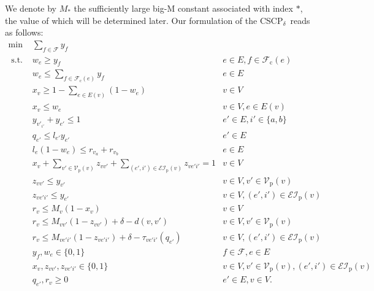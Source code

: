 \documentclass[review]{elsarticle}
\newcommand{\cF}{{\mathcal F}}
\newcommand{\cEI}{{\mathcal {EI}}}
\newcommand{\cV}{{\mathcal V}}
\newcommand{\st}{{\text{ s.t. }}}
\newcommand{\dlt}{{\delta}}
\newcommand{\problem}{CSCP$_\dlt$}
\theoremstyle{definition}
\begin{document}
We denote by $M_{*}$ the sufficiently large big-M constant associated with index $*$, the value of which will be determined later. Our formulation of the \problem\ reads as follows:
\begin{subequations}
	\label{milpa}
	\begin{align}
   	\min & \sum_{f \in \cF} y_f \label{milpa.obj} \\
	\st   & w_{e} \ge y_{f}   &  e \in E, f \in \cF_{\mathrm{c}}(e) \label{milpa.completecover1}\\
      	& w_{e} \le  \sum_{f \in \cF_{\mathrm{c}}(e)}y_{f} 	&  e \in E \label{milpa.completecover2}\\
      	& x_{v}\geq 1-\sum_{e\in E(v)} (1-w_e) &  v\in V \label{milpa.enforcex1}\\
      	& x_{v}\leq w_e &  v\in V, e\in E(v) \label{milpa.enforcex2}\\
	&  y_{v'_{i'}} + y_{e'} \le 1 &   e' \in E, i' \in \{a,b\} \label{milpa.optimale}\\
	& q_{e'}\leq l_{e'}y_{e'} & e'\in E  \label{milpa.coord} \\
	&  l_e (1 - w_e) \le  r_{v_a} + r_{v_b}	& e \in E \label{milpa.covere}\\
  &  x_{v} +\sum_{v' \in \cV_{\mathrm{p}}(v)}  z_{vv'}+ \sum_{(e', i') \in \cEI_{\mathrm{p}}(v)} z_{ve'i'} = 1  &   v\in V \label{milpa.lcoversos} \\
  &   z_{vv'} \le y_{v'}  &  v \in V,  v' \in \cV_{\mathrm{p}}(v) \label{milpa.indicatorv}\\  
	&   z_{ve'i'} \le y_{e'}  &  v \in V,  (e',i') \in \cEI_{\mathrm{p}}(v) \label{milpa.indicatorei}\\  
 &   r_{v} \le M_v (1-x_{v}) &  v\in V \label{milpa.wbdl}\\
 &   r_{v} \le M_{vv'}(1 - z_{vv'})  +  \dlt - d(v,v') & v \in V ,  v' \in \cV_{\mathrm{p}}(v) \label{milpa.coverdist-node} \\
 &   r_{v} \le M_{ve'i'}(1 - z_{ve'{i'}})  +  \dlt - \tau_{ve'i'}(q_{e'}) & v \in V ,  (e',i') \in \cEI_{\mathrm{p}}(v) \label{milpa.coverdist-edge} \\
   &  y_f, w_e  \in \{0,1\} &   f \in \cF,  e \in E \label{milpa.varyw}\\
   & x_{v}, z_{vv'}, z_{ve'{i'}} \in \{0,1\}  & v \in V, v' \in \cV_{\mathrm{p}}(v),(e',i') \in \cEI_{\mathrm{p}}(v)\label{milpa.varindicator}\\
  	& q_{e'}, r_{v} \geq 0 &  e'  \in E, v \in V. \label{milpa.varcontinuous}
	\end{align}
	\end{subequations}
\end{document}
